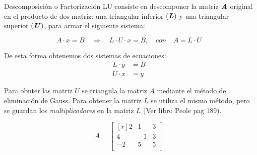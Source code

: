 \documentclass[../main.tex]{subfiles}
\begin{document}
        Descomposición o Factorización LU consiste en descomponer la matriz $\textbf{\textit{A}}$ original en el producto de dos matriz: una triangular inferior $(\textbf{\textit{L}})$ y una triangular superior $(\textbf{\textit{U}})$, para armar el siguiente sistema:

        \begin{equation}
            A \cdot x = B \quad \Rightarrow \quad L \cdot U \cdot x = B, \quad con \quad A = L \cdot U
        \end{equation}

        De esta forma obtenemos dos sistemas de ecuaciones:
        \begin{equation}
            \begin{split}
                L \cdot y &= B\\
                U \cdot x &= y
            \end{split}
        \end{equation}

        Para obnter las matriz $\textit{U}$ se triangula la matriz $\textit{A}$ mediante el método de eliminación de Gauss. Para obtener la matriz $\textit{L}$ se utiliza el mismo método, pero se guardan los \textit{multiplicadores} en la matriz $\textit{L}$ (Ver libro Peole pag 189).

        \begin{equation}
            A = \begin{bmatrix*}[r]
                    2 & 1 & 3 \\
                    4 & -1 & 3 \\
                    -2 & 5 & 5 \\
                \end{bmatrix*}
        \end{equation}
\end{document}
